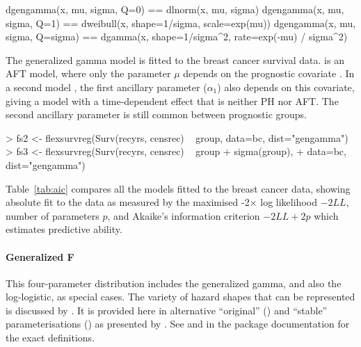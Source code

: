 \documentclass[nojss,nofooter]{jss}
\begin{document}
\begin{Code}
dgengamma(x, mu, sigma, Q=0)     ==  dlnorm(x, mu, sigma)                                
dgengamma(x, mu, sigma, Q=1)     ==  dweibull(x, shape=1/sigma, scale=exp(mu))           
dgengamma(x, mu, sigma, Q=sigma) ==  dgamma(x, shape=1/sigma^2, 
                                               rate=exp(-mu) / sigma^2)  
\end{Code}

The generalized gamma model is fitted to the breast cancer survival
data.  is an AFT model, where only the parameter
$\mu$ depends on the prognostic covariate .  In a second
model , the first ancillary parameter  ($\alpha_1$) also
depends on this covariate, giving a model with a time-dependent effect
that is neither PH nor AFT.  The second ancillary parameter 
is still common between prognostic groups.
\begin{Schunk}
\begin{Sinput}
> fs2 <- flexsurvreg(Surv(recyrs, censrec) ~ group, data=bc, dist="gengamma")
> fs3 <- flexsurvreg(Surv(recyrs, censrec) ~ group + sigma(group), 
+                    data=bc, dist="gengamma")
\end{Sinput}
\end{Schunk}
Table~\ref{tab:aic} compares all the models fitted to the breast
cancer data, showing absolute fit to the data as measured by the
maximised -2$\times$ log likelihood $-2LL$, number of parameters $p$,
and Akaike's information criterion $-2LL + 2p$ which estimates
predictive ability.


\paragraph{Generalized F} This four-parameter distribution includes
the generalized gamma, and also the log-logistic, as special cases.
The variety of hazard shapes that can be represented is discussed by
\citet{ccox:genf}.  It is provided here in alternative ``original''
() and ``stable'' parameterisations
() as presented by \citet{prentice:genf}. 
See  and  in the package documentation 
for the exact definitions.
\end{document}
